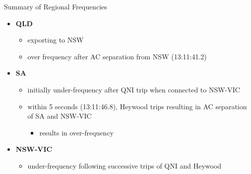 \begin{frame}{Summary of Regional Frequencies}

  \begin{itemize}
    \item \textbf{QLD}
    \begin{itemize}
        \item exporting to NSW
        \item over frequency after AC separation from NSW (13:11:41.2)
    \end{itemize}
    \item \textbf{SA}
      \begin{itemize}
        \item initially under-frequency after QNI trip when connected to NSW-VIC
        \item within 5 seconds (13:11:46.8), Heywood trips resulting in AC separation of SA and NSW-VIC
            \begin{itemize}
                \item results in over-frequency
            \end{itemize}
        \end{itemize}
    \item \textbf{NSW-VIC}
        \begin{itemize}
            \item under-frequency following successive trips of QNI and Heywood
        \end{itemize}
  \end{itemize}


\end{frame}
